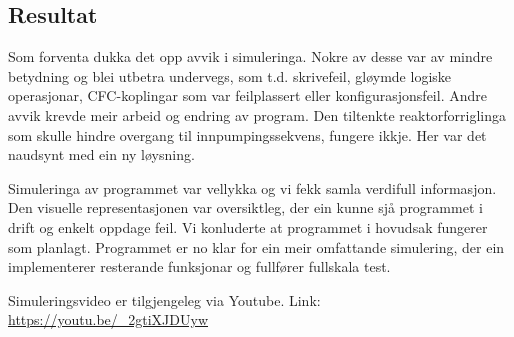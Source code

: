 \newpage

\subsection{Resultat}

Som forventa dukka det opp avvik i simuleringa.
Nokre av desse var av mindre betydning og blei utbetra undervegs, som t.d. skrivefeil, gløymde logiske operasjonar,
\gls{CFC}-koplingar som var feilplassert eller konfigurasjonsfeil. \newline
Andre avvik krevde meir arbeid og endring av program.
Den tiltenkte reaktorforriglinga som skulle hindre overgang til innpumpingssekvens, fungere ikkje.
Her var det naudsynt med ein ny løysning.

Simuleringa av programmet var vellykka og vi fekk samla verdifull informasjon. 
Den visuelle representasjonen var oversiktleg, der ein kunne sjå programmet i drift og enkelt oppdage feil. \newline
Vi konluderte at programmet i hovudsak fungerer som planlagt.
Programmet er no klar for ein meir omfattande simulering, der ein implementerer resterande funksjonar og fullfører fullskala test.

Simuleringsvideo er tilgjengeleg via Youtube. \newline
Link: \url{https://youtu.be/_2gtiXJDUyw}






